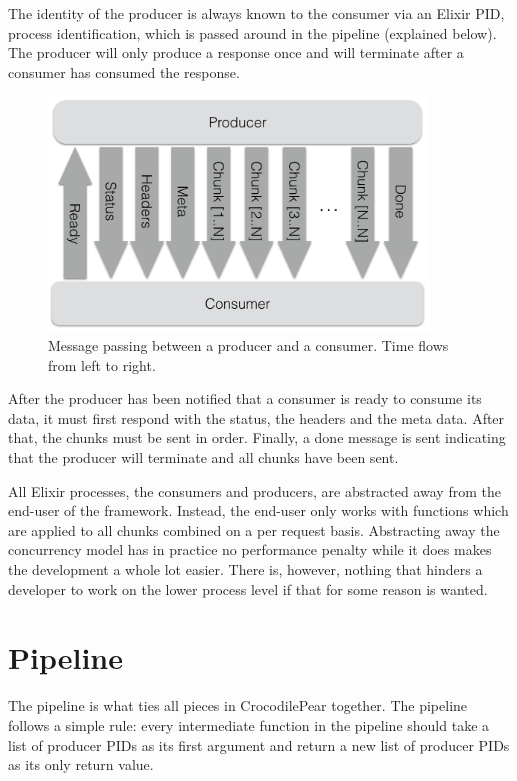 \documentclass{cslthse-msc}
\begin{document}
The identity of the producer is always known to the consumer via an Elixir PID, process identification, which is passed around in the pipeline (explained below). The producer will only produce a response once and will terminate after a consumer has consumed the response.

\begin{figure}[H]
  \centering
    \begin{center}
      \includegraphics[width=0.9\textwidth]{images/crocpear_producer_consumer.png}
    \end{center}
  \caption{Message passing between a producer and a consumer. Time flows from left to right.}
\end{figure}

After the producer has been notified that a consumer is ready to consume its data, it must first respond with the status, the headers and the meta data. After that, the chunks must be sent in order. Finally, a done message is sent indicating that the producer will terminate and all chunks have been sent.

All Elixir processes, the consumers and producers, are abstracted away from the end-user of the framework. Instead, the end-user only works with functions which are applied to all chunks combined on a per request basis. Abstracting away the concurrency model has in practice no performance penalty while it does makes the development a whole lot easier. There is, however, nothing that hinders a developer to work on the lower process level if that for some reason is wanted.

\section{Pipeline}
The pipeline is what ties all pieces in CrocodilePear together. The pipeline follows a simple rule: every intermediate function in the pipeline should take a list of producer PIDs as its first argument and return a new list of producer PIDs as its only return value.
\end{document}
